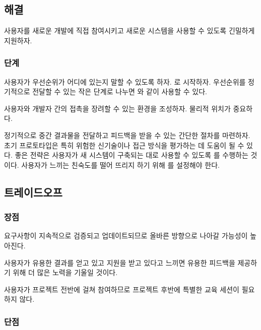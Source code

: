 \documentclass[a4paper,10pt,twoside]{book}
\begin{document}
\subsection*{해결}

사용자를 새로운 개발에 직접 참여시키고 새로운 시스템을 사용할 수 있도록 긴밀하게 지원하자.

\subsubsection*{단계}

사용자가 우선순위가 어디에 있는지 말할 수 있도록 하자. 로 시작하자. 우선순위를 정기적으로 전달할 수 있는 작은 단계로 나누면 와 같이 사용할 수 있다.

사용자와 개발자 간의 접촉을 장려할 수 있는 환경을 조성하자. 물리적 위치가 중요하다.

정기적으로 중간 결과물을 전달하고 피드백을 받을 수 있는 간단한 절차를 마련하자. 초기 프로토타입은 특히 위험한 신기술이나 접근 방식을 평가하는 데 도움이 될 수 있다. 좋은 전략은 사용자가 새 시스템이 구축되는 대로 사용할 수 있도록 를 수행하는 것이다. 사용자가 느끼는 친숙도를 떨어 뜨리지 하기 위해 를 설정해야 한다.

\subsection*{트레이드오프}

\subsubsection*{장점}

\begin{bulletlist}
\item 요구사항이 지속적으로 검증되고 업데이트되므로 올바른 방향으로 나아갈 가능성이 높아진다.

\item 사용자가 유용한 결과를 얻고 있고 지원을 받고 있다고 느끼면 유용한 피드백을 제공하기 위해 더 많은 노력을 기울일 것이다.

\item 사용자가 프로젝트 전반에 걸쳐 참여하므로 프로젝트 후반에 특별한 교육 세션이 필요하지 않다.
\end{bulletlist}

\subsubsection*{단점}
\end{document}

